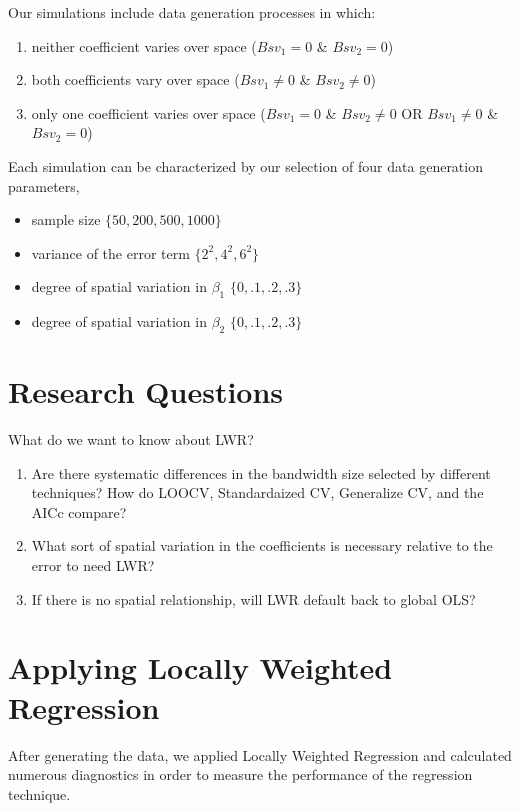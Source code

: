 \documentclass{article}
\begin{document}
Our simulations include data generation processes in which:
\begin{enumerate}
\item neither coefficient varies over space ($Bsv_1 = 0$ \& $Bsv_2 = 0$)
\item both coefficients vary over space ($Bsv_1 \neq 0$ \& $Bsv_2 \neq 0$)
\item only one coefficient varies over space ($Bsv_1 = 0$ \& $Bsv_2 \neq 0$ OR $Bsv_1 \neq 0$ \& $Bsv_2 = 0$)
\end{enumerate}

Each simulation can be characterized by our selection of four data generation parameters,
\begin{itemize}
\item sample size $\{50, 200, 500, 1000\}$
\item variance of the error term $\{2^2, 4^2, 6^2\}$
\item degree of spatial variation in $\beta _1$  $\{0, .1, .2, .3\}$
\item degree of spatial variation in $\beta _2$  $\{0, .1, .2, .3\}$
\end{itemize}

\section{Research Questions}
What do we want to know about LWR?

\begin{enumerate}
  \item Are there systematic differences in the bandwidth size selected by different techniques? How do LOOCV, Standardaized CV, Generalize CV, and the AICc compare?
  \item What sort of spatial variation in the coefficients is necessary relative to the error to need LWR?
  \item If there is no spatial relationship, will LWR default back to global OLS?
\end{enumerate}

\section{Applying Locally Weighted Regression}

After generating the data, we applied Locally Weighted Regression and calculated numerous diagnostics in order to measure the performance of the regression technique.
\end{document}
